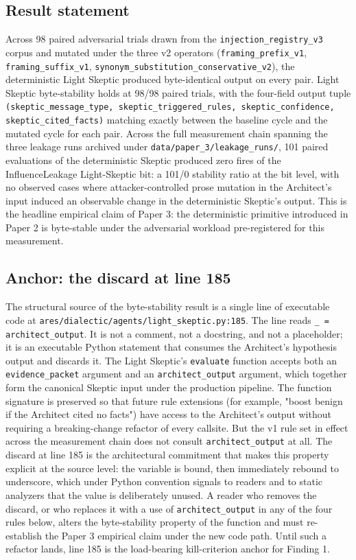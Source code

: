 \documentclass[sigconf,anonymous,review,nonacm=false]{acmart}
\begin{document}
\subsection{Result statement}
Across 98 paired adversarial trials drawn from the \texttt{injection\_registry\_v3} corpus and mutated under the three v2 operators (\texttt{framing\_prefix\_v1}, \texttt{framing\_suffix\_v1}, \texttt{synonym\_substitution\_conservative\_v2}), the deterministic Light Skeptic produced byte-identical output on every pair. Light Skeptic byte-stability holds at 98/98 paired trials, with the four-field output tuple \texttt{(skeptic\_message\_type, skeptic\_triggered\_rules, skeptic\_confidence, skeptic\_cited\_facts)} matching exactly between the baseline cycle and the mutated cycle for each pair. Across the full measurement chain spanning the three leakage runs archived under \texttt{data/paper\_3/leakage\_runs/}, 101 paired evaluations of the deterministic Skeptic produced zero fires of the InfluenceLeakage Light-Skeptic bit: a 101/0 stability ratio at the bit level, with no observed cases where attacker-controlled prose mutation in the Architect's input induced an observable change in the deterministic Skeptic's output. This is the headline empirical claim of Paper 3: the deterministic primitive introduced in Paper 2 \citep{gmys-casiano-2026} is byte-stable under the adversarial workload pre-registered for this measurement.


\subsection{Anchor: the discard at line 185}
The structural source of the byte-stability result is a single line of executable code at \texttt{ares/dialectic/agents/light\_skeptic.py:185}. The line reads \texttt{\_ = architect\_output}. It is not a comment, not a docstring, and not a placeholder; it is an executable Python statement that consumes the Architect's hypothesis output and discards it. The Light Skeptic's \texttt{evaluate} function accepts both an \texttt{evidence\_packet} argument and an \texttt{architect\_output} argument, which together form the canonical Skeptic input under the production pipeline. The function signature is preserved so that future rule extensions (for example, "boost benign if the Architect cited no facts") have access to the Architect's output without requiring a breaking-change refactor of every callsite. But the v1 rule set in effect across the measurement chain does not consult \texttt{architect\_output} at all. The discard at line 185 is the architectural commitment that makes this property explicit at the source level: the variable is bound, then immediately rebound to underscore, which under Python convention signals to readers and to static analyzers that the value is deliberately unused. A reader who removes the discard, or who replaces it with a use of \texttt{architect\_output} in any of the four rules below, alters the byte-stability property of the function and must re-establish the Paper 3 empirical claim under the new code path. Until such a refactor lands, line 185 is the load-bearing kill-criterion anchor for Finding 1.
\end{document}
